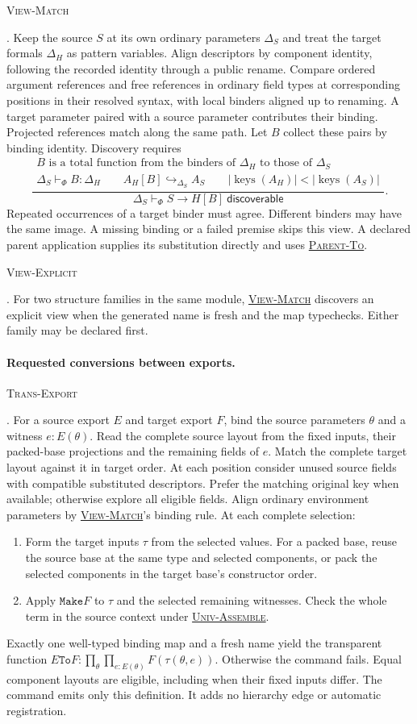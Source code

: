 \documentclass{article}
\newcommand{\ttt}[1]{\texttt{#1}}
\newcommand{\keys}{\operatorname{keys}}
\newcommand{\rdefn}[1]{\hypertarget{rule-#1}{\textsc{#1}}}
\newcommand{\ruse}[1]{\hyperlink{rule-#1}{\textsc{#1}}}
\begin{document}
\rdefn{View-Match}. Keep the source $S$ at its own ordinary parameters
$\Delta_S$ and treat the target formals $\Delta_H$ as pattern variables.
Align descriptors by component identity, following the recorded identity
through a public rename. Compare ordered argument references and
free references in ordinary field types at corresponding positions in
their resolved syntax, with local binders aligned up to renaming.
A target parameter paired with a source parameter contributes their
binding. Projected references match along the same path.
Let $B$ collect these pairs by binding identity. Discovery requires
\[
 \frac{\begin{gathered}
 B\text{ is a total function from the binders of }\Delta_H
      \text{ to those of }\Delta_S\\
 \Delta_S\vdash_\Phi B:\Delta_H \qquad
 A_H[B]\hookrightarrow_{\Delta_S} A_S \qquad
 |\keys(A_H)|<|\keys(A_S)|
 \end{gathered}}
 {\Delta_S\vdash_\Phi S\longrightarrow H[B]\ \mathsf{discoverable}} .
\]
Repeated occurrences of a target binder must agree. Different binders
may have the same image. A missing binding or a failed premise skips
this view. A declared parent application supplies its substitution
directly and uses \ruse{Parent-To}.

\rdefn{View-Explicit}. For two structure families in the same module,
\ruse{View-Match} discovers an explicit view when the generated name is
fresh and the map typechecks. Either family may be declared first.

\paragraph{Requested conversions between exports.}
\rdefn{Trans-Export}. For a source export $E$ and target export $F$, bind
the source parameters $\theta$ and a witness $e:E(\theta)$. Read the
complete source layout from the fixed inputs, their packed-base
projections and the remaining fields of $e$. Match the complete target
layout against it in target order. At each position consider unused source
fields with compatible substituted descriptors. Prefer the matching
original key when available; otherwise explore all eligible fields. Align ordinary environment parameters
by \ruse{View-Match}'s binding rule. At each complete selection:
\begin{enumerate}
\item Form the target inputs $\tau$ from the selected values. For a packed
base, reuse the source base at the same type and selected components,
or pack the selected components in the target base's constructor order.
\item Apply $\ttt{Make}F$ to $\tau$ and the selected remaining witnesses.
Check the whole term in the source context under \ruse{Univ-Assemble}.
\end{enumerate}
Exactly one well-typed binding map and a fresh name yield the transparent
function $E\ttt{To}F:\prod_\theta\prod_{e:E(\theta)}F(\tau(\theta,e))$.
Otherwise the command fails. Equal component layouts are eligible,
including when their fixed inputs differ. The command emits only this
definition. It adds no hierarchy edge or automatic registration.
\end{document}

